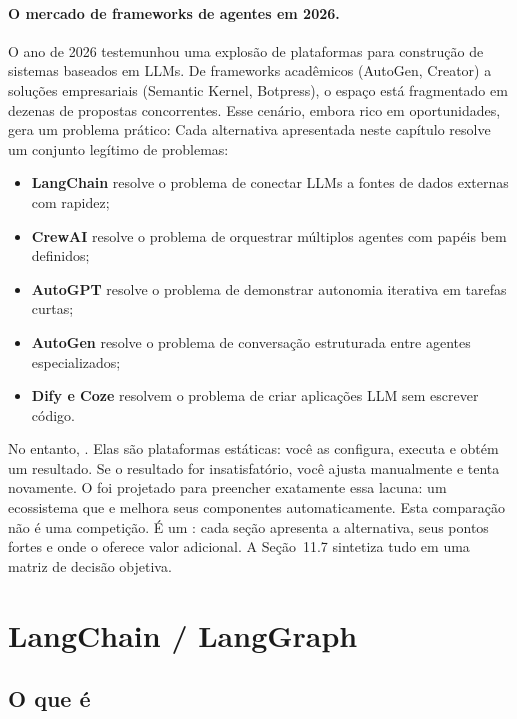 \paragraph{O mercado de frameworks de agentes em 2026.} O ano de 2026
testemunhou uma explosão de plataformas para construção de sistemas
baseados em LLMs. De frameworks acadêmicos (AutoGen, Creator) a soluções
empresariais (Semantic Kernel, Botpress), o espaço está fragmentado em
dezenas de propostas concorrentes. Esse cenário, embora rico em
oportunidades, gera um problema prático: 
Cada alternativa apresentada neste capítulo resolve um conjunto legítimo de
problemas:
\begin{itemize}
\item \textbf{LangChain} resolve o problema de conectar LLMs a fontes
de dados externas com rapidez;
\item \textbf{CrewAI} resolve o problema de orquestrar múltiplos
agentes com papéis bem definidos;
\item \textbf{AutoGPT} resolve o problema de demonstrar autonomia
iterativa em tarefas curtas;
\item \textbf{AutoGen} resolve o problema de conversação estruturada
entre agentes especializados;
\item \textbf{Dify e Coze} resolvem o problema de criar aplicações
LLM sem escrever código.
\end{itemize}
No entanto, . Elas são plataformas estáticas: você as configura, executa e
obtém um resultado. Se o resultado for insatisfatório, você ajusta
manualmente e tenta novamente. O \opencodeeco{} foi projetado para
preencher exatamente essa lacuna: um ecossistema que  e melhora seus componentes automaticamente.
Esta comparação não é uma competição. É um :
cada seção apresenta a alternativa, seus pontos fortes e onde o
\opencodeeco{} oferece valor adicional. A Seção~11.7 sintetiza tudo em uma
matriz de decisão objetiva.
\section{LangChain / LangGraph}
\label{sec:langchain}
\nivelbasico
\subsection{O que é}
